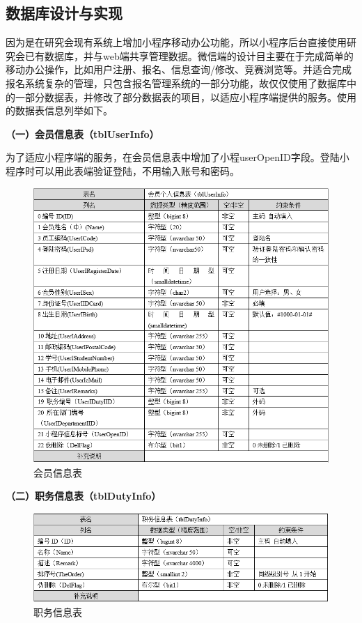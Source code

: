 \documentclass[a4paper]{ltxdoc}
\begin{document}
{		
		\subsection{数据库设计与实现}
		因为是在研究会现有系统上增加小程序移动办公功能，所以小程序后台直接使用研究会已有数据库，并与web端共享管理数据。微信端的设计目主要在于完成简单的移动办公操作，比如用户注册、报名、信息查询/修改、竞赛浏览等。并适合完成报名系统复杂的管理，只包含报名管理系统的一部分功能，故仅仅使用了数据库中的一部分数据表，并修改了部分数据表的项目，以适应小程序端提供的服务。使用的数据表信息列举如下。
		
		\textbf{（一）会员信息表（tblUserInfo）}
		
		为了适应小程序端的服务，在会员信息表中增加了小程userOpenID字段。登陆小程序时可以用此表端验证登陆，不用输入账号和密码。
		\begin{figure}[H]
			\centering
			\includegraphics[width=1.0\linewidth]{images/dbtable/tblUserInfo.png}
			\caption{会员信息表}
		\end{figure}
		
		\textbf{（二）职务信息表（tblDutyInfo）}
		\begin{figure}[H]
			\centering
			\includegraphics[width=1.0\linewidth]{images/dbtable/tblDutyInfo.png}
			\caption{职务信息表}
		\end{figure}
		
}
\end{document}

